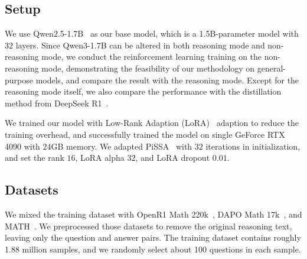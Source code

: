 \subsection{Setup}\label{subsec:setup}

We use Qwen2.5-1.7B~\citep{qwen2, qwen2.5} as our base model, which is a 1.5B-parameter model with $32$ layers.
Since Qwen3-1.7B can be altered in both reasoning mode and non-reasoning mode, we conduct the reinforcement learning training on the non-reasoning mode, demonstrating the feasibility of our methodology on general-purpose models, and compare the result with the reasoning mode.
Except for the reasoning mode itself, we also compare the performance with the distillation method from DeepSeek R1~\citep{deepseekai2025deepseekr1incentivizingreasoningcapability}.

We trained our model with Low-Rank Adaption (LoRA)~\citep{hu2022lora} adaption to reduce the training overhead, and successfully trained the model on single GeForce RTX 4090 with 24GB memory.
We adapted PiSSA~\citep{NEURIPS2024_db36f4d6} with $32$ iterations in initialization, and set the rank $16$, LoRA alpha $32$, and LoRA dropout $0.01$.

\subsection{Datasets}\label{subsec:datasets}

We mixed the training dataset with OpenR1 Math 220k~\citep{openr1}, DAPO Math 17k~\citep{yu2025dapoopensourcellmreinforcement}, and MATH~\citep{NEURIPS_DATASETS_AND_BENCHMARKS2021_be83ab3e}.
We preprocessed those datasets to remove the original reasoning text, leaving only the question and answer pairs.
The training dataset contains roughly 1.88 million samples, and we randomly select about 100 questions in each sample.
